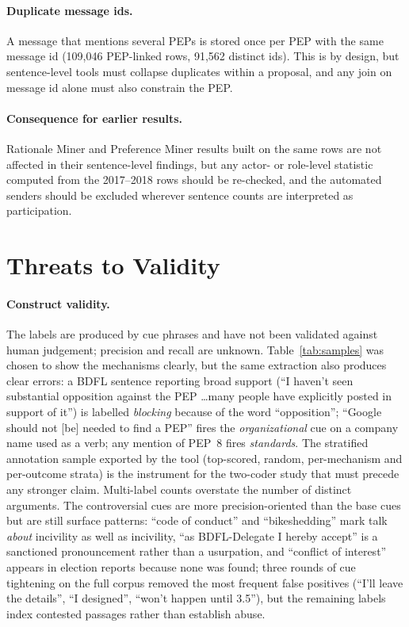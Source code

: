 \documentclass[sigconf,screen]{acmart}
\begin{document}
\paragraph{Duplicate message ids.} A message that mentions several PEPs is stored once per PEP with the same message id (109,046 PEP-linked rows, 91,562 distinct ids). This is by design, but sentence-level tools must collapse duplicates within a proposal, and any join on message id alone must also constrain the PEP.

\paragraph{Consequence for earlier results.} Rationale Miner and Preference Miner results built on the same rows are not affected in their sentence-level findings, but any actor- or role-level statistic computed from the 2017--2018 rows should be re-checked, and the automated senders should be excluded wherever sentence counts are interpreted as participation.

\section{Threats to Validity}
\label{sec:threats}

\paragraph{Construct validity.} The labels are produced by cue phrases and have not been validated against human judgement; precision and recall are unknown. Table~\ref{tab:samples} was chosen to show the mechanisms clearly, but the same extraction also produces clear errors: a BDFL sentence reporting broad support (``I haven't seen substantial opposition against the PEP \ldots many people have explicitly posted in support of it'') is labelled \emph{blocking} because of the word ``opposition''; ``Google should not [be] needed to find a PEP'' fires the \emph{organizational} cue on a company name used as a verb; any mention of PEP~8 fires \emph{standards}. The stratified annotation sample exported by the tool (top-scored, random, per-mechanism and per-outcome strata) is the instrument for the two-coder study that must precede any stronger claim. Multi-label counts overstate the number of distinct arguments. The controversial cues are more precision-oriented than the base cues but are still surface patterns: ``code of conduct'' and ``bikeshedding'' mark talk \emph{about} incivility as well as incivility, ``as BDFL-Delegate I hereby accept'' is a sanctioned pronouncement rather than a usurpation, and ``conflict of interest'' appears in election reports because none was found; three rounds of cue tightening on the full corpus removed the most frequent false positives (``I'll leave the details'', ``I designed'', ``won't happen until 3.5''), but the remaining labels index contested passages rather than establish abuse.
\end{document}
